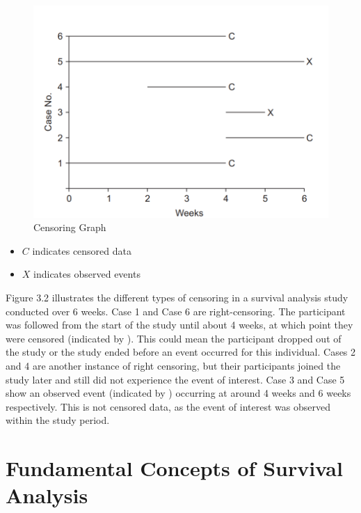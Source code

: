 \documentclass[12pt]{report} %
\begin{document}
\begin{figure}[H]
    \centering
    \includegraphics[width=01\linewidth]{Figure 3/3.2.png}
    \caption{Censoring Graph}
    \label{Figure 3.2}
\end{figure}


\begin{itemize}

\item \(C\) indicates censored data
\item  \(X\) indicates observed events


\end{itemize}

Figure 3.2 illustrates the different types of censoring in a survival analysis study conducted over 6 weeks. Case 1 and Case 6 are right-censoring. The participant was followed from the start of the study until about 4 weeks, at which point they were censored (indicated by ). This could mean the participant dropped out of the study or the study ended before an event occurred for this individual. Cases 2 and 4 are another instance of right censoring, but their participants joined the study later and still did not experience the event of interest. Case 3 and Case 5 show an observed event (indicated by ) occurring at around 4 weeks and 6 weeks respectively. This is not censored data, as the event of interest was observed within the study period.

\section{Fundamental Concepts of Survival Analysis}
\end{document}
